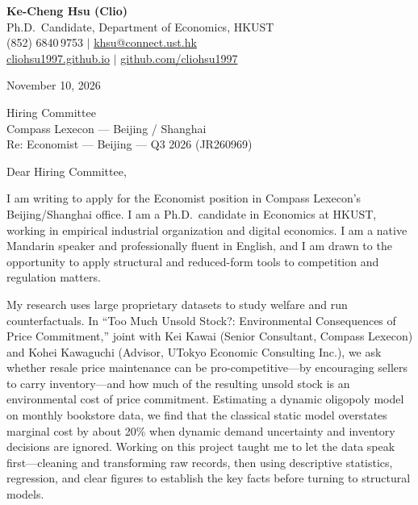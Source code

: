 \documentclass[11pt,letterpaper]{article}
\begin{document}
\noindent
{\bfseries Ke-Cheng Hsu (Clio)}\\
Ph.D.\ Candidate, Department of Economics, HKUST\\
(852) 6840\,9753 \quad $|$ \quad \href{mailto:khsu@connect.ust.hk}{khsu@connect.ust.hk}\\
\href{https://cliohsu1997.github.io/}{cliohsu1997.github.io} \quad $|$ \quad \href{https://github.com/cliohsu1997}{github.com/cliohsu1997}

\vspace{0.7em}
\noindent
November 10, 2026

\vspace{0.35em}
\noindent
Hiring Committee\\
Compass Lexecon --- Beijing / Shanghai\\
Re: Economist --- Beijing --- Q3 2026 (JR260969)

\vspace{0.2em}
Dear Hiring Committee,

I am writing to apply for the Economist position in Compass Lexecon's Beijing/Shanghai office. I am a Ph.D.\ candidate in Economics at HKUST, working in empirical industrial organization and digital economics. I am a native Mandarin speaker and professionally fluent in English, and I am drawn to the opportunity to apply structural and reduced-form tools to competition and regulation matters.

My research uses large proprietary datasets to study welfare and run counterfactuals. In ``Too Much Unsold Stock?: Environmental Consequences of Price Commitment,'' joint with Kei Kawai (Senior Consultant, Compass Lexecon) and Kohei Kawaguchi (Advisor, UTokyo Economic Consulting Inc.), we ask whether resale price maintenance can be pro-competitive---by encouraging sellers to carry inventory---and how much of the resulting unsold stock is an environmental cost of price commitment. Estimating a dynamic oligopoly model on monthly bookstore data, we find that the classical static model overstates marginal cost by about 20\% when dynamic demand uncertainty and inventory decisions are ignored. Working on this project taught me to let the data speak first---cleaning and transforming raw records, then using descriptive statistics, regression, and clear figures to establish the key facts before turning to structural models.
\end{document}
